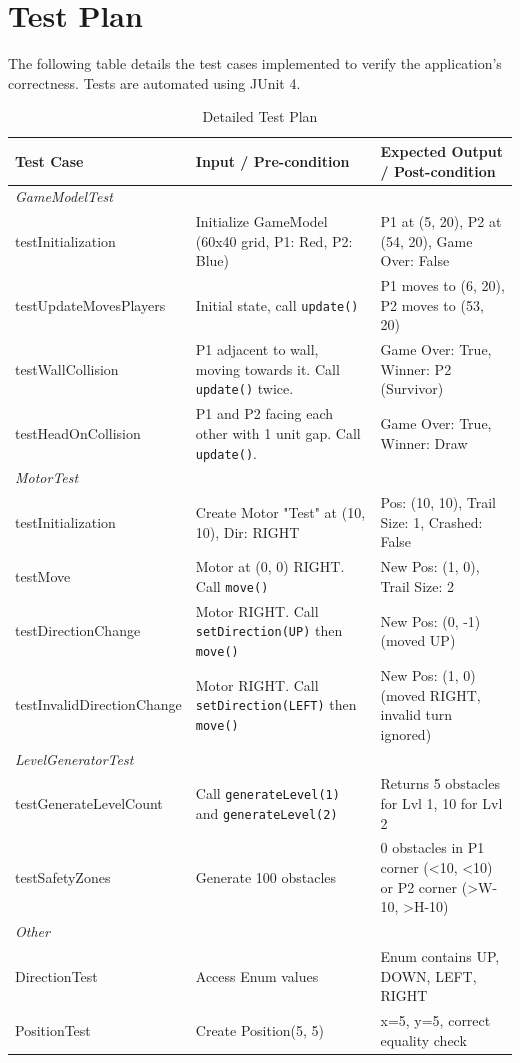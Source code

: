 \documentclass[12pt,a4paper]{article}
\begin{document}
\newpage

\section{Test Plan}

The following table details the test cases implemented to verify the application's correctness. Tests are automated using JUnit 4.

\begin{table}[H]
\centering
\begin{tabularx}{\textwidth}{|l|X|X|}
\hline
\textbf{Test Case} & \textbf{Input / Pre-condition} & \textbf{Expected Output / Post-condition} \\
\hline
\textit{GameModelTest} & & \\
\hline
testInitialization & Initialize GameModel (60x40 grid, P1: Red, P2: Blue) & P1 at (5, 20), P2 at (54, 20), Game Over: False \\
\hline
testUpdateMovesPlayers & Initial state, call \texttt{update()} & P1 moves to (6, 20), P2 moves to (53, 20) \\
\hline
testWallCollision & P1 adjacent to wall, moving towards it. Call \texttt{update()} twice. & Game Over: True, Winner: P2 (Survivor) \\
\hline
testHeadOnCollision & P1 and P2 facing each other with 1 unit gap. Call \texttt{update()}. & Game Over: True, Winner: Draw \\
\hline
\textit{MotorTest} & & \\
\hline
testInitialization & Create Motor "Test" at (10, 10), Dir: RIGHT & Pos: (10, 10), Trail Size: 1, Crashed: False \\
\hline
testMove & Motor at (0, 0) RIGHT. Call \texttt{move()} & New Pos: (1, 0), Trail Size: 2 \\
\hline
testDirectionChange & Motor RIGHT. Call \texttt{setDirection(UP)} then \texttt{move()} & New Pos: (0, -1) (moved UP) \\
\hline
testInvalidDirectionChange & Motor RIGHT. Call \texttt{setDirection(LEFT)} then \texttt{move()} & New Pos: (1, 0) (moved RIGHT, invalid turn ignored) \\
\hline
\textit{LevelGeneratorTest} & & \\
\hline
testGenerateLevelCount & Call \texttt{generateLevel(1)} and \texttt{generateLevel(2)} & Returns 5 obstacles for Lvl 1, 10 for Lvl 2 \\
\hline
testSafetyZones & Generate 100 obstacles & 0 obstacles in P1 corner (<10, <10) or P2 corner (>W-10, >H-10) \\
\hline
\textit{Other} & & \\
\hline
DirectionTest & Access Enum values & Enum contains UP, DOWN, LEFT, RIGHT \\
\hline
PositionTest & Create Position(5, 5) & x=5, y=5, correct equality check \\
\hline
\end{tabularx}
\caption{Detailed Test Plan}
\end{table}
\end{document}
